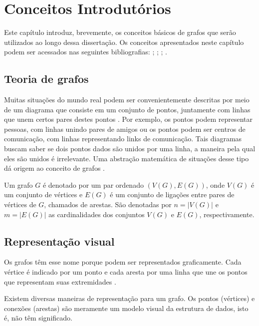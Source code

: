 \graphicspath{{\currfiledir/images/}}

\chapter{Conceitos Introdutórios}


Este capítulo introduz, brevemente, os conceitos básicos de grafos que serão utilizados ao longo dessa dissertação. Os conceitos apresentados neste capítulo podem ser acessados nas seguintes bibliografias: \cite{bondymurty1976}; \cite{west2002}; \cite{bondymurty2008}; \cite{feofiloff2018}.


\section{Teoria de grafos}
Muitas situações do mundo real podem ser convenientemente descritas por meio de um diagrama que consiste em um conjunto de pontos, juntamente com linhas que unem certos pares destes pontos \cite{bondymurty1976}. Por exemplo, os pontos podem representar pessoas, com linhas unindo pares de amigos ou os pontos podem ser centros de comunicação, com linhas representando links de comunicação. Tais diagramas buscam saber se dois pontos dados são unidos por uma linha, a maneira pela qual eles são unidos é irrelevante. Uma abstração matemática de situações desse tipo dá origem ao conceito de grafos \cite{bondymurty2008}.

\begin{definition}
    Um grafo $G$ é denotado por um par ordenado $(V(G), E(G))$, onde $V(G)$ é um conjunto de vértices e $E(G)$ é um conjunto de ligações entre pares de vértices de $G$, chamados de arestas. São denotadas por $n = |V(G)|$ e $m = |E(G)|$ as cardinalidades dos conjuntos $V(G)$ e $E(G)$, respectivamente.
\end{definition}


\section{Representação visual}
Os grafos têm esse nome porque podem ser representados graficamente. Cada vértice é indicado por um ponto e cada aresta por uma linha que une os pontos que representam suas extremidades \cite{bondymurty1976}.

Existem diversas maneiras de representação para um grafo. Os pontos (vértices) e conexões (arestas) são meramente um modelo visual da estrutura de dados, isto é, não têm significado.

